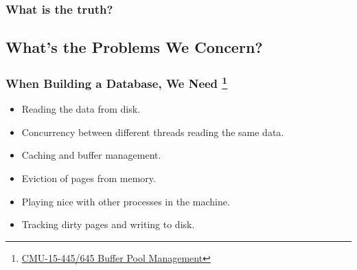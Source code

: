 \documentclass[10pt,svgnames,fragile]{beamer}
\begin{document}
\begin{frame}
	\frametitle{What is the truth?}
	\begin{center}
		\fontsize{20pt}{\baselineskip}
	\end{center}
\end{frame}
	
\subsection{What's the Problems We Concern? }
\begin{frame}
	\frametitle{When Building a Database, We Need \footnote[frame]{\href{https://github.com/liu-jianhao/CMU-15-445/blob/627707b1b996ea923c9e0cfb90cb3cfe73f3aa98/Lab/src/buffer/buffer_pool_manager.cpp\#L63}{CMU-15-445/645 Buffer Pool Management}}}
	\begin{itemize}
		\item Reading the data from disk.
		\item Concurrency between different threads reading the same data.
		\item Caching and buffer management.
		\item Eviction of pages from memory.
		\item Playing nice with other processes in the machine.
		\item Tracking dirty pages and writing to disk.
	\end{itemize}
\end{frame}
\end{document}

